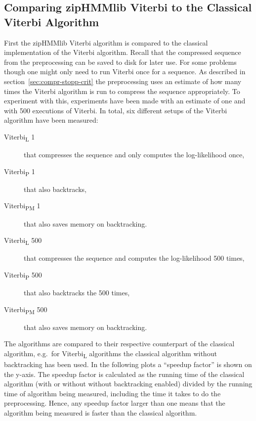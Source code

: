 \subsection{Comparing zipHMMlib Viterbi to the Classical Viterbi Algorithm}
\label{sec:comp-ziphmml-viterbi}

First the zipHMMlib Viterbi algorithm is compared to the classical
implementation of the Viterbi algorithm. Recall that the compressed sequence
from the preprocessing can be saved to disk for later use. For some problems
though one might only need to run Viterbi once for a sequence. As described in
section~\ref{sec:compr-stopp-crit} the preprocessing uses an estimate of how
many times the Viterbi algorithm is run to compress the sequence appropriately.
To experiment with this, experiments have been made with an estimate of one and
with 500 executions of Viterbi. In total, six different setups of the Viterbi
algorithm have been measured:
\begin{description}
\item[Viterbi\textsubscript{L} 1] that compresses the sequence and only computes the
  log-likelihood once,
\item[Viterbi\textsubscript{P} 1] that also backtracks,
\item[Viterbi\textsubscript{PM} 1] that also saves memory on backtracking.
\item[Viterbi\textsubscript{L} 500] that compresses the sequence and computes the
  log-likelihood 500 times,
\item[Viterbi\textsubscript{P} 500] that also backtracks the 500 times,
\item[Viterbi\textsubscript{PM} 500] that also saves memory on backtracking.
\end{description}

The algorithms are compared to their respective counterpart of the classical
algorithm, e.g.\ for Viterbi\textsubscript{L} algorithms the classical
algorithm without backtracking has been used. In the following plots a
``speedup factor'' is shown on the y-axis. The speedup factor is calculated as
the running time of the classical algorithm (with or without without backtracking
enabled) divided by the running time of algorithm being measured, including the
time it takes to do the preprocessing. Hence, any speedup factor larger than one
means that the algorithm being measured is faster than the classical algorithm.

